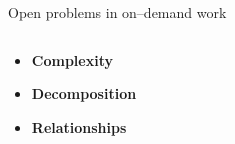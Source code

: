 \documentclass[presentation]{subfiles}
\begin{document}
\begin{frame}{Open problems in on--demand work}
\begin{columns}
\begin{column}[T]{0.5\textwidth}
  \begin{itemize}%
    \item<2,4> \textbf{\large Complexity}
    
    \scriptsize{
    \textcite{suzukiAtelier,KimStoria,yuanAlmost,Yu2016b,Nebeling:2016:WCW:2858036.2858169,Hahn:2016:KAB:2858036.2858364}
    }
    \vspace{8mm}
    
    \item<3> \textbf{\large Decomposition}

    \scriptsize{
    \textcite{sensitiveTasks,LykourentzouPersonalityMatters,Law:2016:CKC:2858036.2858144,Chang:2016:ACC:2858036.2858411,Newell:2016:OMA:2858036.2858490}
    }
    \vspace{8mm}

    \item<5> \textbf{\large Relationships}

    \scriptsize{
      \textcite{turkopticon,storiesIraniSilberman,crowdcollab,takingAHITMcInnis,dynamo,uberAlgorithm}
    }

  \end{itemize}
\end{column}

\begin{column}[T]{0.25\textwidth}
  \begin{figure}
    \centering
    \vspace{-5mm}


\end{figure}
\end{column}
\end{columns}
\end{frame}
\end{document}
